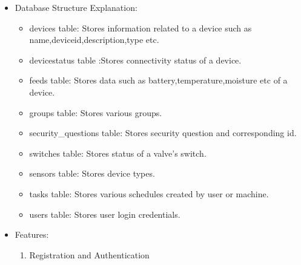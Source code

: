 \documentclass[a4paper,12pt,oneside]{book}
\begin{document}
\begin{enumerate}
\begin{itemize}
        
    \item{Database Structure Explanation: }
    \begin{itemize}
        \item{devices table: Stores information related to a device such as name,deviceid,description,type etc. }
        \item{devicestatus table :Stores connectivity status of a device.}
        \item{feeds table: Stores data such as battery,temperature,moisture etc of a device.}
        \item{groups table: Stores various groups.}
        \item{security\_questions table: Stores security question and corresponding id.}
        \item{switches table: Stores status of a valve's switch.}
        \item{sensors table: Stores device types.}
        \item{tasks table: Stores various schedules created by user or machine.}
        \item{users table: Stores user login credentials.}
    \end{itemize}
    \newpage
    \item{Features:}
        \begin{enumerate}
        \setlength\itemsep{0.2cm}
            \item{Registration and Authentication}
                \begin{itemize}
                \setlength\itemsep{0.2cm}
                    

\end{itemize}
\end{enumerate}
\end{itemize}
\end{enumerate}
\end{document}
